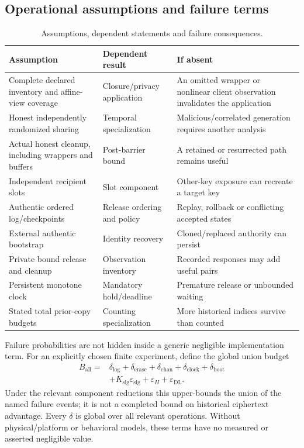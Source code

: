 \documentclass[pdflatex,sn-mathphys-num]{sn-jnl}
\theoremstyle{plain}
\theoremstyle{definition}
\begin{document}
\subsection{Operational assumptions and failure terms}
\begin{table}[htbp]
\caption{Assumptions, dependent statements and failure consequences.}\label{tab:assumptions}
\centering\footnotesize
\begin{tabularx}{\linewidth}{@{}p{.26\linewidth}YY@{}}\toprule
Assumption & Dependent result & If absent\\\midrule
Complete declared inventory and affine-view coverage & Closure/privacy application & An omitted wrapper or nonlinear client observation invalidates the application\\
Honest independently randomized sharing & Temporal specialization & Malicious/correlated generation requires another analysis\\
Actual honest cleanup, including wrappers and buffers & Post-barrier bound & A retained or resurrected path remains useful\\
Independent recipient slots & Slot component & Other-key exposure can recreate a target key\\
Authentic ordered log/checkpoints & Release ordering and policy & Replay, rollback or conflicting accepted states\\
External authentic bootstrap & Identity recovery & Cloned/replaced authority can persist\\
Private bound release and cleanup & Observation inventory & Recorded responses may add useful pairs\\
Persistent monotone clock & Mandatory hold/deadline & Premature release or unbounded waiting\\
Stated total prior-copy budgets & Counting specialization & More historical indices survive than counted\\\bottomrule
\end{tabularx}
\end{table}

Failure probabilities are not hidden inside a generic negligible implementation term. For an explicitly chosen finite experiment, define the global union budget
\begin{align}\label{eq:budget}
 B_{\mathrm{all}}={}&\delta_{\mathrm{log}}+\delta_{\mathrm{erase}}+\delta_{\mathrm{chan}}
 +\delta_{\mathrm{clock}}+\delta_{\mathrm{boot}}\\
 &+K_{\mathrm{sig}}\varepsilon_{\mathrm{sig}}+\varepsilon_H+\varepsilon_{\mathrm{DL}}.\nonumber
\end{align}
Under the relevant component reductions this upper-bounds the union of the named failure events; it is not a completed bound on historical ciphertext advantage. Every $\delta$ is global over all relevant operations. Without physical/platform or behavioral models, these terms have no measured or asserted negligible value.
\end{document}
